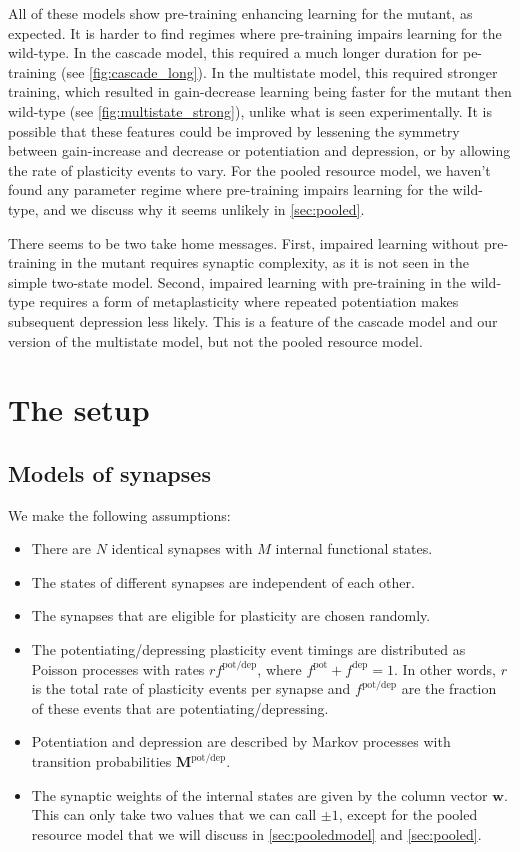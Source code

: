 \documentclass[12pt]{article}
\newcommand{\w}{\mathbf{w}}
\newcommand{\M}{\mathbf{M}}
\newcommand{\pot}{^{\text{pot}}}
\newcommand{\dep}{^{\text{dep}}}
\newcommand{\potdep}{^{\text{pot/dep}}}
\begin{document}
All of these models show pre-training enhancing learning for the mutant, as expected.
It is harder to find regimes where pre-training impairs learning for the wild-type.
In the cascade model, this required a much longer duration for pe-training (see \autoref{fig:cascade_long}).
In the multistate model, this required stronger training, which resulted in gain-decrease learning being faster for the mutant then wild-type (see \autoref{fig:multistate_strong}), unlike what is seen experimentally.
It is possible that these features could be improved by lessening the symmetry between gain-increase and decrease or potentiation and depression, or by allowing the rate of plasticity events to vary.
For the pooled resource model, we haven't found any parameter regime where pre-training impairs learning for the wild-type, and we discuss why it seems unlikely in \autoref{sec:pooled}.

There seems to be two take home messages.
First, impaired learning without pre-training in the mutant requires synaptic complexity, as it is not seen in the simple two-state model.
Second, impaired learning with pre-training in the wild-type requires a form of metaplasticity where repeated potentiation makes subsequent depression less likely.
This is a feature of the cascade model and our version of the multistate model, but not the pooled resource model.


\section{The setup}\label{sec:setup}


\subsection{Models of synapses}\label{sec:synapse}

We make the following assumptions:
\begin{itemize}
  \item There are $N$ identical synapses with $M$ internal functional states.
  \item The states of different synapses are independent of each other.
  \item The synapses that are eligible for plasticity are chosen randomly.
  \item The potentiating/depressing plasticity event timings are distributed as Poisson processes with rates $rf\potdep$, where $f\pot+f\dep=1$.
      In other words, $r$ is the total rate of plasticity events per synapse and $f\potdep$ are the fraction of these events that are potentiating/depressing.
  \item Potentiation and depression are described by Markov processes with transition probabilities $\M\potdep$.
  \item The synaptic weights of the internal states are given by the column vector $\w$. This can only take two values that we can call $\pm1$, except for the pooled resource model that we will discuss in \autoref{sec:pooledmodel} and \autoref{sec:pooled}.
\end{itemize}
\end{document}
